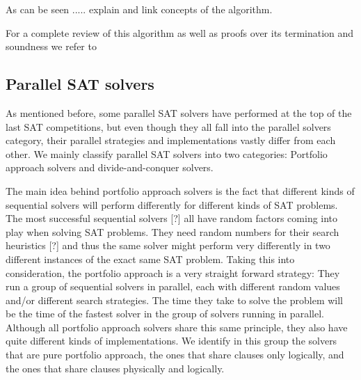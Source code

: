 \documentclass{llncs}
\begin{document}


As can be seen ..... explain and link concepts of the algorithm.

For a complete review of this algorithm as well as proofs over its
termination and soundness we refer to \cite{Nieuwenhuisetal2006JACM}


\subsection{Parallel SAT solvers}

As mentioned before, some parallel SAT solvers have performed at the
top of the last SAT competitions, but even though they all fall into
the parallel solvers category, their parallel strategies and
implementations vastly differ from each other. We mainly classify
parallel SAT solvers into two categories: Portfolio approach solvers
and divide-and-conquer solvers.

The main idea behind portfolio approach solvers is the fact that
different kinds of sequential solvers will perform differently for
different kinds of SAT problems. The most successful sequential
solvers [?] all have random factors coming into play when solving SAT
problems. They need random numbers for their search heuristics [?] and
thus the same solver might perform very differently in two different
instances of the exact same SAT problem. Taking this into
consideration, the portfolio approach is a very straight forward
strategy: They run a group of sequential solvers in parallel, each
with different random values and/or different search strategies. The
time they take to solve the problem will be the time of the fastest
solver in the group of solvers running in parallel. Although all
portfolio approach solvers share this same principle, they also have
quite different kinds of implementations. We identify in this group
the solvers that are pure portfolio approach, the ones that share
clauses only logically, and the ones that share clauses physically and
logically.
\end{document}
